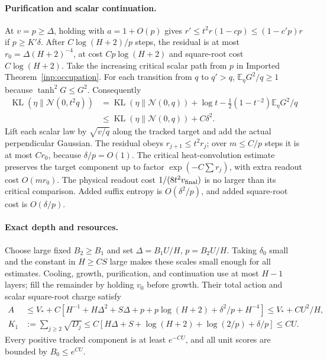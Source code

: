 \documentclass[11pt]{article}
\newcommand{\E}{\mathbb E}
\newcommand{\KL}{\operatorname{KL}}
\begin{document}
\paragraph{Purification and scalar continuation.}
At $v=p\ge\Delta$, holding with $a=1+O(p)$ gives
$r'\le t^2r(1-cp)\le(1-c'p)r$ if $p\ge K'\delta$.
After $C\log(H+2)/p$ steps, the residual is at most
$r_0=\Delta(H+2)^{-4}$, at cost $Cp\log(H+2)$ and square-root cost
$C\log(H+2)$.
Take the increasing critical scalar path from $p$ in
Imported Theorem~\ref{inp:occupation}. For each transition from $q$ to
$q'>q$, $\E_\eta G^2/q\ge1$ because $\tanh^2G\le G^2$. Consequently
\begin{align*}
 \KL(\eta\|\mathcal N(0,t^2q))
 &=\KL(\eta\|\mathcal N(0,q))+\log t
       -\tfrac12(1-t^{-2})\E_\eta G^2/q\\
 &\le\KL(\eta\|\mathcal N(0,q))+C\delta^2.
\end{align*}
Lift each scalar law by $\sqrt{v/q}$ along the tracked target and add
the actual perpendicular Gaussian. The residual obeys $r_{j+1}\le t^2r_j$;
over $m\le C/p$ steps it is at most $Cr_0$, because $\delta/p=O(1)$.
The critical heat-convolution estimate preserves the target component
up to factor $\exp(-C\sum r_j)$, with extra readout cost $O(mr_0)$.
The physical readout cost $1/(8t^2v_{\rm final})$ is no larger than
its critical comparison. Added suffix entropy is $O(\delta^2/p)$,
and added square-root cost is $O(\delta/p)$.

\paragraph{Exact depth and resources.}
Choose large fixed $B_2\ge B_1$ and set
$\Delta=B_1U/H$, $p=B_2U/H$. Taking $\delta_0$ small and the constant
in $H\ge CS$ large makes these scales small enough for all estimates.
Cooling, growth, purification, and continuation use at most $H-1$
layers; fill the remainder by holding $v_0$ before growth. Their total
action and scalar square-root charge satisfy
\begin{align}
 A&\le V_*+C[H^{-1}+H\Delta^2+S\Delta+p+p\log(H+2)
                 +\delta^2/p+H^{-4}]
       \le V_*+CU^2/H,\label{eq:action}\\
 K_1&:=\sum_{j\ge2}\sqrt{D_j}
 \le C[H\Delta+S+\log(H+2)+\log(2/p)+\delta/p]\le CU.
\end{align}
Every positive tracked component is at least $e^{-CU}$, and all unit
scores are bounded by $B_0\le e^{CU}$.
\end{document}
